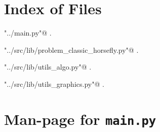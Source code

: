 \documentclass[11.5pt]{report}
\begin{document}
\begin{appendices}
\chapter{Index of Files}

{\small\begin{list}{}{\setlength{\itemsep}{-\parsep}\setlength{\itemindent}{-\leftmargin}}
\item \verb@"../main.py"@ {\footnotesize {\NWtxtDefBy} .}
\item \verb@"../src/lib/problem_classic_horsefly.py"@ {\footnotesize {\NWtxtDefBy} .}
\item \verb@"../src/lib/utils_algo.py"@ {\footnotesize {\NWtxtDefBy} .
}
\item \verb@"../src/lib/utils_graphics.py"@ {\footnotesize {\NWtxtDefBy} .
}
\end{list}}
\chapter{Man-page for \texttt{main.py}}


\end{appendices}
\end{document}
